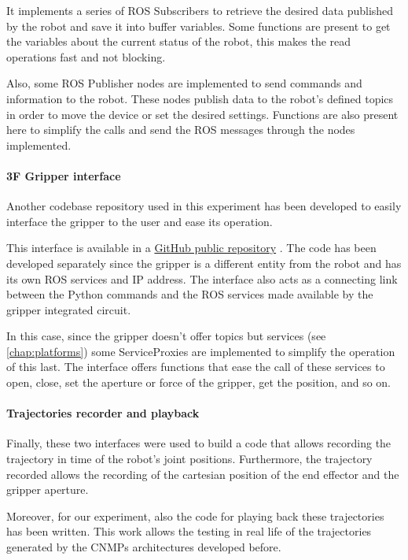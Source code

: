 It implements a series of ROS Subscribers to retrieve the desired data published by the robot and save it into buffer variables. 
Some functions are present to get the variables about the current status of the robot, this makes the read operations fast and not blocking. 

Also, some ROS Publisher nodes are implemented to send commands and information to the robot. These nodes publish data to the robot's defined topics in order to move the device or set the desired settings. Functions are also present here to simplify the calls and send the ROS messages through the nodes implemented. 

\paragraph{3F Gripper interface} Another codebase repository used in this experiment has been developed to easily interface the gripper to the user and ease its operation. 

This interface is available in a \href{https://github.com/igor-lirussi/Gripper3F_interface}{GitHub public repository} \cite{url:3FGripperrepo}. The code has been developed separately since the gripper is a different entity from the robot and has its own ROS services and IP address. The interface also acts as a connecting link between the Python commands and the ROS services made available by the gripper integrated circuit.

In this case, since the gripper doesn't offer topics but services (see \cref{chap:platforms}) some ServiceProxies are implemented to simplify the operation of this last. The interface offers functions that ease the call of these services to open, close, set the aperture or force of the gripper, get the position, and so on. 

\paragraph{Trajectories recorder and playback} Finally, these two interfaces were used to build a code that allows recording the trajectory in time of the robot's joint positions. Furthermore, the trajectory recorded allows the recording of the cartesian position of the end effector and the gripper aperture.

Moreover, for our experiment, also the code for playing back these trajectories has been written. This work allows the testing in real life of the trajectories generated by the CNMPs architectures developed before. 

